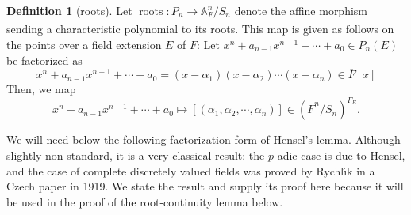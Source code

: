 \documentclass[11pt,a4paper]{article}
\theoremstyle{definition}
\newtheorem{D}[shared]{Definition}
\theoremstyle{plain}
\theoremstyle{remark}
\theoremstyle{plain}
\DeclareMathOperator{\roots}{roots}
\begin{document}
\begin{D}[roots]
    Let $\roots: P_n \xrightarrow[]{} \mathbb{A}^n_F/S_n$ denote the affine morphism sending a characteristic polynomial to its roots. This map is given as follows on the points over a field extension $E$ of $F$: Let $x^n + a_{n-1}x^{n-1} + \cdots + a_0 \in P_n(E)$ be factorized as $$x^n + a_{n-1}x^{n-1} + \cdots + a_0 = (x-\alpha_1)(x-\alpha_2)\cdots(x - \alpha_n) \in \overline{F}[x]$$ Then, we map $$ x^n + a_{n-1}x^{n-1} + \cdots + a_0 \mapsto [(\alpha_1, \alpha_2, \cdots ,\alpha_n)] \in (\overline{F}^n/S_n)^{\Gamma_E}.$$
\end{D}

We will need below the following factorization form of Hensel's lemma. Although slightly non-standard, it is a very classical result: the $p$-adic case is due to Hensel, and the case of complete discretely valued fields was proved by Rychl\'{\i}k in a Czech paper in 1919. We state the result and supply its proof here because it will be used in the proof of the root-continuity lemma below.
\end{document}
